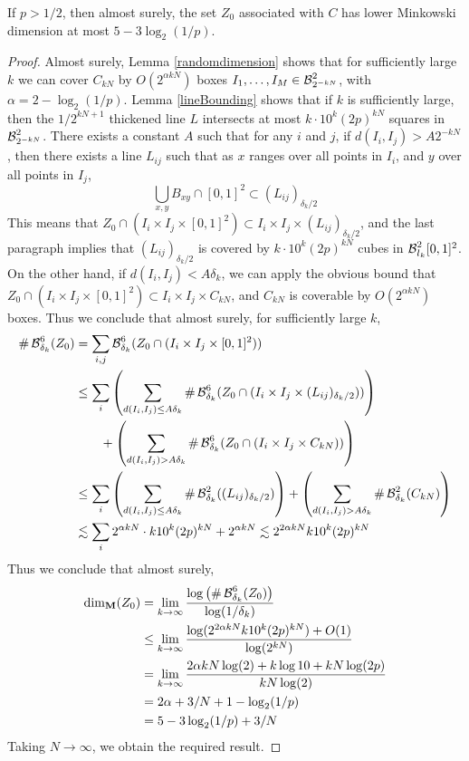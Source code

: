 \begin{theorem}
	If $p > 1/2$, then almost surely, the set $Z_0$ associated with $C$ has lower Minkowski dimension at most $5 - 3 \log_2(1/p)$.
\end{theorem}
\begin{proof}
	Almost surely, Lemma \ref{randomdimension} shows that for sufficiently large $k$ we can cover $C_{kN}$ by $O(2^{\alpha kN})$ boxes $I_1, \dots, I_M \in \operatorname{\mathcal{B}}^2_{2^{-kN}}$, with $\alpha = 2 - \log_2(1/p)$. Lemma \ref{lineBounding} shows that if $k$ is sufficiently large, then the $1/2^{kN+1}$ thickened line $L$ intersects at most $k \cdot 10^k (2p)^{kN}$ squares in $\operatorname{\mathcal{B}}^2_{2^{-kN}}$. There exists a constant $A$ such that for any $i$ and $j$, if $d(I_i, I_j) > A 2^{-kN}$, then there exists a line $L_{ij}$ such that as $x$ ranges over all points in $I_i$, and $y$ over all points in $I_j$,
	\[ \bigcup_{x,y} B_{xy} \cap [0,1]^2 \subset (L_{ij})_{\delta_k/2} \]
	This means that $Z_0 \cap (I_i \times I_j \times [0,1]^2) \subset I_i \times I_j \times (L_{ij})_{\delta_k/2}$, and the last paragraph implies that $(L_{ij})_{\delta_k/2}$ is covered by $k \cdot 10^k (2p)^{kN}$ cubes in $\operatorname{\mathcal{B}}^2_{l_k}[0,1]^2$. On the other hand, if $d(I_i,I_j) < A \delta_k$, we can apply the obvious bound that $Z_0 \cap (I_i \times I_j \times [0,1]^2) \subset I_i \times I_j \times C_{kN}$, and $C_{kN}$ is coverable by $O(2^{\alpha kN})$ boxes. Thus we conclude that almost surely, for sufficiently large $k$,
	\begin{align*}
		\# \operatorname{\mathcal{B}}^6_{\delta_k}(Z_0) &= \sum_{i,j} \operatorname{\mathcal{B}}^6_{\delta_k}(Z_0 \cap (I_i \times I_j \times [0,1]^2)) \\
		&\leq \sum_i \left( \sum_{d(I_i,I_j) \leq A \delta_k} \# \operatorname{\mathcal{B}}^6_{\delta_k}(Z_0 \cap (I_i \times I_j \times (L_{ij})_{\delta_k/2})) \right)\\
		&\quad\quad+ \left( \sum_{d(I_i,I_j) > A \delta_k} \# \operatorname{\mathcal{B}}^6_{\delta_k}(Z_0 \cap (I_i \times I_j \times C_{kN})) \right)\\
		&\leq \sum_i \left( \sum_{d(I_i,I_j) \leq A \delta_k} \# \operatorname{\mathcal{B}}^2_{\delta_k}((L_{ij})_{\delta_k/2}) \right) + \left( \sum_{d(I_i,I_j) > A \delta_k} \# \operatorname{\mathcal{B}}^2_{\delta_k}(C_{kN}) \right)\\
		&\lesssim \sum_i 2^{\alpha kN} \cdot k 10^k (2p)^{kN} + 2^{\alpha kN} \lesssim 2^{2\alpha kN} k 10^k (2p)^{kN}
	\end{align*}
	Thus we conclude that almost surely,
	\begin{align*}
		\operatorname{\dim_{\mathbf{M}}}(Z_0) &= \lim_{k \to \infty} \frac{\log \left( \# \operatorname{\mathcal{B}}^6_{\delta_k}(Z_0) \right)}{\log(1/\delta_k)}\\
		&\leq \lim_{k \to \infty} \frac{\log(2^{2 \alpha kN} k 10^k (2p)^{kN}) + O(1)}{\log(2^{kN})}\\
		&= \lim_{k \to \infty} \frac{2 \alpha k N \log(2) + k \log 10 + kN \log(2p)}{kN \log(2)}\\
		&= 2 \alpha + 3/N + 1 - \log_2(1/p)\\
		&= 5 - 3\log_2(1/p) + 3/N
	\end{align*}
	Taking $N \to \infty$, we obtain the required result.
\end{proof}


